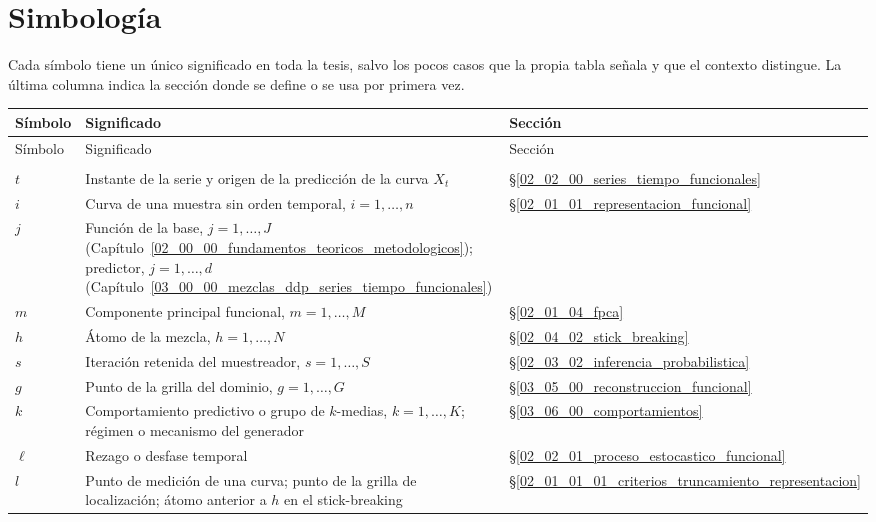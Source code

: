 \chapter*{Simbología}

Cada símbolo tiene un único significado en toda la tesis, salvo los pocos casos que la propia tabla señala y que el contexto distingue. La última columna indica la sección donde se define o se usa por primera vez.

\small
\setlength{\tabcolsep}{4pt}
\begin{longtable}{p{} p{} p{}}
\hline
Símbolo & Significado & Sección \\
\hline
\endfirsthead
\hline
Símbolo & Significado & Sección \\
\hline
\endhead
\hline
\endfoot
\multicolumn{3}{l}{\textit{Índices}} \\
\hline
$t$ & Instante de la serie y origen de la predicción de la curva $X_t$ & \S\ref{02_02_00_series_tiempo_funcionales} \\
$i$ & Curva de una muestra sin orden temporal, $i = 1, \dots, n$ & \S\ref{02_01_01_representacion_funcional} \\
$j$ & Función de la base, $j = 1, \dots, J$ (Capítulo~\ref{02_00_00_fundamentos_teoricos_metodologicos}); predictor, $j = 1, \dots, d$ (Capítulo~\ref{03_00_00_mezclas_ddp_series_tiempo_funcionales}) & \\
$m$ & Componente principal funcional, $m = 1, \dots, M$ & \S\ref{02_01_04_fpca} \\
$h$ & Átomo de la mezcla, $h = 1, \dots, N$ & \S\ref{02_04_02_stick_breaking} \\
$s$ & Iteración retenida del muestreador, $s = 1, \dots, S$ & \S\ref{02_03_02_inferencia_probabilistica} \\
$g$ & Punto de la grilla del dominio, $g = 1, \dots, G$ & \S\ref{03_05_00_reconstruccion_funcional} \\
$k$ & Comportamiento predictivo o grupo de $k$-medias, $k = 1, \dots, K$; régimen o mecanismo del generador & \S\ref{03_06_00_comportamientos} \\
$\ell$ & Rezago o desfase temporal & \S\ref{02_02_01_proceso_estocastico_funcional} \\
$l$ & Punto de medición de una curva; punto de la grilla de localización; átomo anterior a $h$ en el stick-breaking & \S\ref{02_01_01_01_criterios_truncamiento_representacion} \\

\end{longtable}
